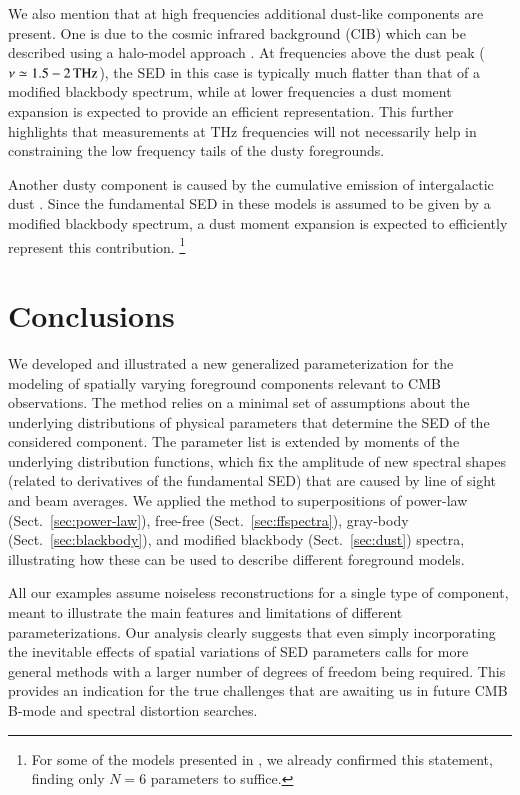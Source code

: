 \documentclass[usenatbib]{mn2e}
\begin{document}
We also mention that at high frequencies additional dust-like components are present. One is due to the cosmic infrared background (CIB) which can be described using a halo-model approach \citep[e.g.,][]{Vince2015}. At frequencies above the dust peak ($\nu \simeq 1.5-2\,{\rm THz}$), the SED in this case is typically much flatter than that of a modified blackbody spectrum, while at lower frequencies a dust moment expansion is expected to provide an efficient representation. This further highlights that measurements at THz frequencies will not necessarily help in constraining the low frequency tails of the dusty foregrounds. 

Another dusty component is caused by the cumulative emission of intergalactic dust \citep{Imara2016}. Since the fundamental SED in these models is assumed to be given by a modified blackbody spectrum, a dust moment expansion is expected to efficiently represent this contribution. \footnote{For some of the models presented in \citet{Imara2016}, we already confirmed this statement, finding only $N=6$ parameters to suffice.}


\vspace{-0mm}
\section{Conclusions} 
%
We developed and illustrated a new generalized parameterization for the modeling of spatially varying foreground components relevant to CMB observations. The method relies on a minimal set of assumptions about the underlying distributions of physical parameters that determine the SED of the considered component. The parameter list is extended by moments of the underlying distribution functions, which fix the amplitude of new spectral shapes (related to derivatives of the fundamental SED) that are caused by line of sight and beam averages. We applied the method to superpositions of power-law (Sect.~\ref{sec:power-law}), free-free (Sect.~\ref{sec:ffspectra}), gray-body (Sect.~\ref{sec:blackbody}), and modified blackbody (Sect.~\ref{sec:dust}) spectra, illustrating how these can be used to describe different foreground models. 

All our examples assume noiseless reconstructions for a single type of component, meant to illustrate the main features and limitations of different parameterizations. Our analysis clearly suggests that even simply incorporating the inevitable effects of spatial variations of SED parameters calls for more general methods with a larger number of degrees of freedom being required. This provides an indication for the true challenges that are awaiting us in future CMB B-mode and spectral distortion searches.
\end{document}
